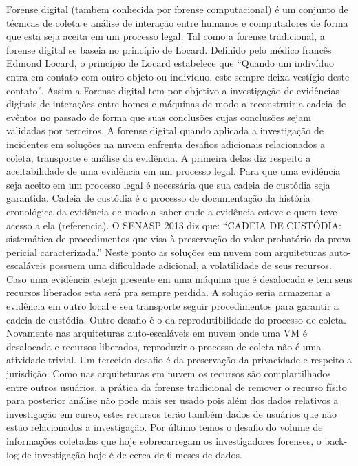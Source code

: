 Forense digital (tambem conhecida por forense computacional) é um conjunto de técnicas de coleta e análise de interação entre humanos e computadores de forma que esta seja aceita em um processo legal.
%
Tal como a forense tradicional, a forense digital se baseia no princípio de Locard. Definido pelo médico francês Edmond Locard, o princípio de Locard estabelece que ``Quando um indivíduo entra em contato com outro objeto ou indivíduo, este sempre deixa vestígio deste contato''. \cite{Ramos:2011}
%
Assim a Forense digital tem por objetivo a investigação de evidências digitais de interações entre homes e máquinas de modo a reconstruir a cadeia de evêntos no passado de forma que suas conclusões cujas conclusões sejam validadas por terceiros.
%
A forense digital quando aplicada a investigação de incidentes em soluções na nuvem enfrenta desafios adicionais relacionados a coleta, transporte e análise da evidência.
%
A primeira delas diz respeito a aceitabilidade de uma evidência em um processo legal. Para que uma evidência seja aceito em um processo legal é necessária que sua cadeia de custódia seja garantida.
%
Cadeia de custódia é o processo de documentação da história cronológica da evidência de modo a saber onde a evidência esteve e quem teve acesso a ela (referencia). O SENASP 2013 diz que: ``CADEIA DE CUSTÓDIA: sistemática de procedimentos que visa à preservação do valor probatório da prova pericial caracterizada.''
%
Neste ponto as soluções em nuvem com arquiteturas auto-escaláveis possuem uma dificuldade adicional, a volatilidade de seus recursos. Caso uma evidência esteja presente em uma máquina que é desalocada e tem seus recursos liberados esta será pra sempre perdida.
%
A solução seria armazenar a evidência em outro local e seu transporte seguir procedimentos para garantir a cadeia de custódia.
%
Outro desafio é o da reprodutibilidade do processo de coleta. Novamente nas arquiteturas auto-escaláveis em nuvem onde uma VM é desalocada e recursos liberados, reproduzir o processo de coleta não é uma atividade trivial.
%
Um terceido desafio é da preservação da privacidade e respeito a jurisdição. Como nas arquiteturas em nuvem os recursos são complartilhados entre outros usuários, a prática da forense tradicional de remover o recurso físito para posterior análise não pode mais ser usado pois além dos dados relativos a investigação em curso, estes recursos terão também dados de usuários que não estão relacionados a investigação. 
%
Por último temos o desafio do volume de informações coletadas que hoje sobrecarregam os investigadores forenses, o back-log de investigação hoje é de cerca de 6 meses de dados.

